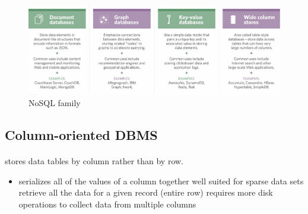 \documentclass[paper=letter, fontsize=12pt]{article}
\begin{document}
\begin{figure}[H]
	\bgroup
	\setlength{\parindent}{-5em}
	\includegraphics[width=550px]{refs/data_management-nosql.jpg}
	\egroup
	\caption{NoSQL family}
\end{figure}


\subsection{Column-oriented DBMS}
	\paragraph{} stores data tables by column rather than by row.
	\begin{itemize}
		\item serializes all of the values of a column together
		\tick well suited for sparse data sets
		\fail retrieve all the data for a given record (entire row) requires more disk operations to collect data from multiple columns
	\end{itemize}
	
\end{document}
